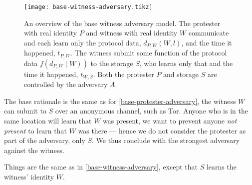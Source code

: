 \begin{figure}
  \centering
  \texttt{[image: base-witness-adversary.tikz]}
  \caption{\label{fig:witness-adversary}%
    An overview of the base witness adversary model.
    The protester with real identity \(P\) and witness with real identity \(W\) 
    communicate and each learn only the protocol data, \(d_{P,W}(W, l)\), and 
    the time it happened, \(t_{P,W}\).
    The witness submit some function of the protocol data \(f(d_{P,W}(W))\) to 
    the storage \(S\), who learns only that and the time it happened, 
    \(t_{W,S}\).
    Both the protester \(P\) and storage \(S\) are controlled by the adversary 
    \(A\).
  }
\end{figure}

The base rationale is the same as for \cref{base-protester-adversary}, the 
witness \(W\) can submit to \(S\) over an anonymous channel, such as \ac{Tor}.
Anyone who is in the same location will learn that \(W\) was present, we want 
to prevent anyone \emph{not present} to learn that \(W\) was there --- hence we 
do not consider the protester as part of the adversary, only \(S\).
We thus conclude with the strongest adversary against the witness.

\begin{definition}
  Things are the same as in \cref{base-witness-adversary}, except that \(S\) 
  learns the witness' identity \(W\).
\end{definition}

